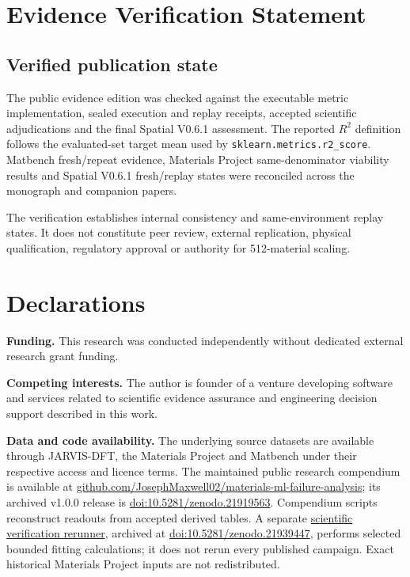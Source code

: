 \documentclass[11pt,a4paper,oneside]{report}
\begin{document}
\chapter{Evidence Verification Statement}
\section{Verified publication state}
The public evidence edition was checked against the executable metric implementation,
sealed execution and replay receipts, accepted scientific adjudications and the final
Spatial V0.6.1 assessment. The reported $R^2$ definition follows the evaluated-set
target mean used by \texttt{sklearn.metrics.r2\_score}. Matbench fresh/repeat evidence,
Materials Project same-denominator viability results and Spatial V0.6.1 fresh/replay
states were reconciled across the monograph and companion papers.

The verification establishes internal consistency and same-environment replay states.
It does not constitute peer review, external replication, physical qualification,
regulatory approval or authority for 512-material scaling.


\chapter*{Declarations}

\textbf{Funding.} This research was conducted independently without dedicated external research grant funding.

\textbf{Competing interests.} The author is founder of a venture developing software and services related to scientific evidence assurance and engineering decision support described in this work.

\textbf{Data and code availability.} The underlying source datasets are available through JARVIS-DFT, the Materials Project and Matbench under their respective access and licence terms. The maintained public research compendium is available at \href{https://github.com/JosephMaxwell02/materials-ml-failure-analysis}{github.com/JosephMaxwell02/materials-ml-failure-analysis}; its archived v1.0.0 release is \href{https://doi.org/10.5281/zenodo.21919563}{doi:10.5281/zenodo.21919563}. Compendium scripts reconstruct readouts from accepted derived tables. A separate \href{https://github.com/JosephMaxwell02/materials-ml-scientific-verification-rerunner}{scientific verification rerunner}, archived at \href{https://doi.org/10.5281/zenodo.21939447}{doi:10.5281/zenodo.21939447}, performs selected bounded fitting calculations; it does not rerun every published campaign. Exact historical Materials Project inputs are not redistributed.
\end{document}
